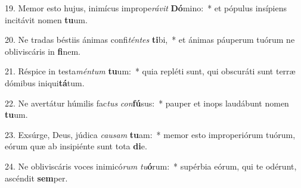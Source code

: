 19. Memor esto hujus, inimícus imprope\textit{rá}\textit{vit} \textbf{Dó}mino:~*  et pópulus insípiens incitávit nomen \textbf{tu}um.\

20. Ne tradas béstiis ánimas confi\textit{tén}\textit{tes} \textbf{ti}bi,~*  et ánimas páuperum tuórum ne obliviscáris in \textbf{fi}nem.\

21. Réspice in testa\textit{mén}\textit{tum} \textbf{tu}um:~*  quia repléti sunt, qui obscuráti sunt terræ dómibus iniqui\textbf{tá}tum.\

22. Ne avertátur húmilis fac\textit{tus} \textit{con}\textbf{fú}sus:~*  pauper et inops laudábunt nomen \textbf{tu}um.\

23. Exsúrge, Deus, júdica \textit{cau}\textit{sam} \textbf{tu}am:~*  memor esto improperiórum tuórum, eórum quæ ab insipiénte sunt tota \textbf{di}e.\

24. Ne obliviscáris voces inimicó\textit{rum} \textit{tu}\textbf{ó}rum:~*  supérbia eórum, qui te odérunt, ascéndit \textbf{sem}per.\

